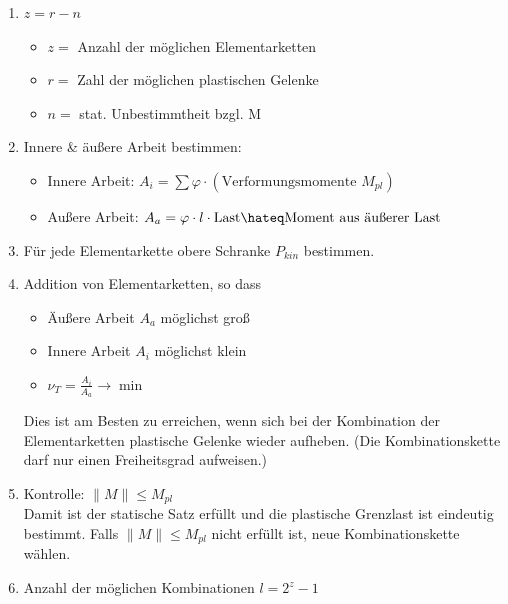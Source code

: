\documentclass[fleqn,twoside]{article}
\begin{document}
\begin{enumerate}
            \item $z=r-n$
                \begin{itemize}
                    \item $z=$ Anzahl der möglichen Elementarketten
                    \item $r=$ Zahl der möglichen plastischen Gelenke
                    \item $n=$ stat. Unbestimmtheit bzgl. M
                \end{itemize}
            \item Innere \& äußere Arbeit bestimmen:
                \begin{itemize}
                    \item Innere Arbeit: $A_i = \sum \varphi \cdot (\text{Verformungsmomente } M_{pl}) $
                    \item Außere Arbeit: $A_a = \varphi \cdot l \cdot \text{Last} \hateq \text{Moment aus äußerer Last}$ 
                \end{itemize}
            \item Für jede Elementarkette obere Schranke $P_{k i n}$ bestimmen.
            \item Addition von Elementarketten, so dass
                \begin{itemize}  \item Äußere Arbeit $A_a$ möglichst groß \item Innere Arbeit $A_i$ möglichst klein \item $\nu_T=\frac{A_i}{A_a} \rightarrow \min$ \end{itemize}
                Dies ist am Besten zu erreichen, wenn sich bei der Kombination der Elementarketten plastische Gelenke wieder aufheben. (Die Kombinationskette darf nur einen Freiheitsgrad aufweisen.)
            \item Kontrolle: $\|M\| \leq M_{p l}$\\
                Damit ist der statische Satz erfüllt und die plastische Grenzlast ist eindeutig bestimmt. Falls $\|M\| \leq M_{p l}$ nicht erfüllt ist, neue Kombinationskette wählen.
            \item Anzahl der möglichen Kombinationen $l=2^z-1$
        \end{enumerate}
\end{document}
